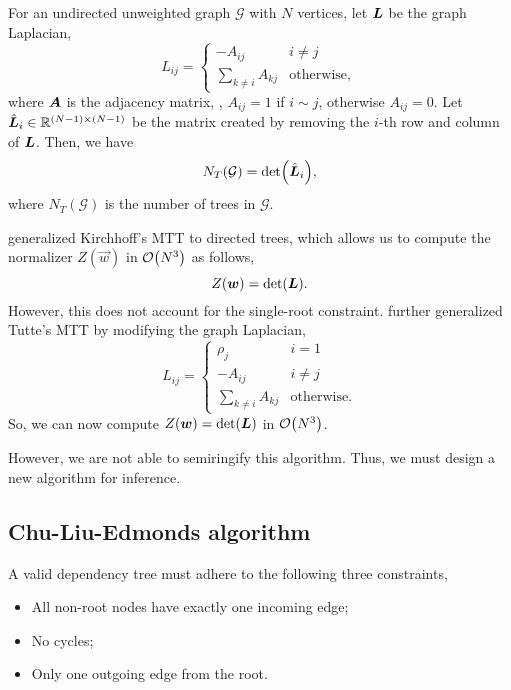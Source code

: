 \begin{theorem} \label{thm:kirchhoff}
  For an undirected unweighted graph $\mathcal{G}$ with $N$ vertices, let
  $\bm{L}$ be the graph Laplacian, \[
    L_{ij} = \begin{cases}
      -A_{ij} & i \neq j \\
      \sum_{k \neq i} A_{kj} & \mathrm{otherwise},
    \end{cases}
  \]
  where $\bm{A}$ is the adjacency matrix, \ie, $A_{ij}=1$ if $i \sim j$,
  otherwise $A_{ij}=0$. Let $\hat{\bm{L}}_i \in \mathbb{R}^{(N-1)\times(N-1)}$ be the
  matrix created by removing the $i$-th row and column of $\bm{L}$. Then, we
  have \[
    N_T(\mathcal{G}) = \det{\hat{\mat{L}}_i}
  ,\]
  where $N_T(\mathcal{G})$ is the number of trees in $\mathcal{G}$.
\end{theorem}

\citet{tutte1948dissection} generalized Kirchhoff's MTT to directed trees,
which allows us to compute the normalizer $Z(\vec{w})$ in $\bigo{N^3}$ as
follows,
\[
  Z(\bm{w}) = \det{\mat{L}}
.\]
However, this does not account for the single-root constraint.
\citet{koo2007structured} further generalized Tutte's MTT by modifying the
graph Laplacian, \[
  L_{ij} = \begin{cases}
    \rho_j & i = 1 \\
    -A_{ij} & i \neq j \\
    \sum_{k \neq i} A_{kj} & \mathrm{otherwise}.
  \end{cases}
\]
So, we can now compute $Z(\vec{w}) = \det{\mat{L}}$ in $\bigo{N^3}$.

However, we are not able to semiringify this algorithm. Thus, we must design a
new algorithm for inference.

\subsection{Chu-Liu-Edmonds algorithm}

A valid dependency tree must adhere to the following three constraints,
\begin{itemize}
  \item All non-root nodes have exactly one incoming edge;
  \item No cycles;
  \item Only one outgoing edge from the root.
\end{itemize}

